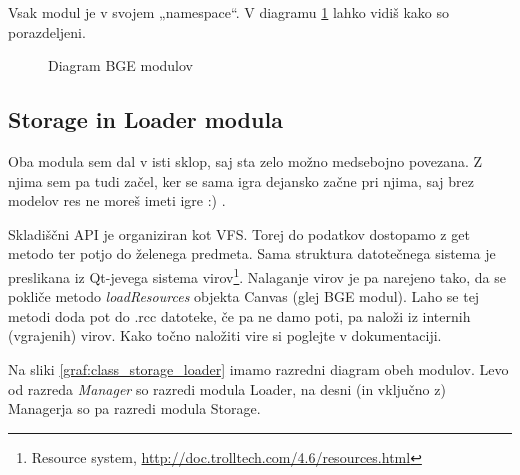 \documentclass[a4paper]{article}
\begin{document}
Vsak modul je v svojem „namespace“. V diagramu \ref{graf:bge_diagram} lahko vidiš kako so porazdeljeni.
\begin{figure}
  \centering
  
  \label{graf:bge_diagram}
  \caption{Diagram BGE modulov}
\end{figure}

\subsection{Storage in Loader modula}
Oba modula sem dal v isti sklop, saj sta zelo možno medsebojno povezana. Z njima sem pa tudi začel, ker se sama igra dejansko začne pri njima, saj brez modelov res ne moreš imeti igre :) .

Skladiščni API je organiziran kot VFS. Torej do podatkov dostopamo z get metodo ter potjo do želenega predmeta. Sama struktura datotečnega sistema je preslikana iz Qt-jevega sistema virov\footnote{Resource system, \href{http://doc.trolltech.com/4.6/resources.html}{http://doc.trolltech.com/4.6/resources.html}}. Nalaganje virov je pa narejeno tako, da se pokliče metodo \emph{loadResources} objekta Canvas (glej BGE modul). Laho se tej metodi doda pot do .rcc datoteke, če pa ne damo poti, pa naloži iz internih (vgrajenih) virov. Kako točno naložiti vire si poglejte v dokumentaciji.

Na sliki \ref{graf:class_storage_loader} imamo razredni diagram obeh modulov. Levo od razreda \emph{Manager} so razredi modula Loader, na desni (in vključno z) Managerja so pa razredi modula Storage.
\end{document}
